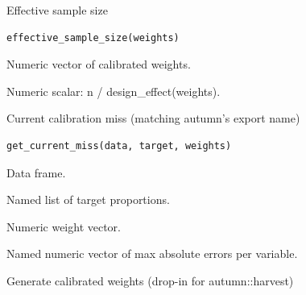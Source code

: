 \documentclass[a4paper]{book}
\begin{document}
%
\begin{Description}
Effective sample size
\end{Description}
%
\begin{Usage}
\begin{verbatim}
effective_sample_size(weights)
\end{verbatim}
\end{Usage}
%
\begin{Arguments}
\begin{ldescription}
\item[\code{weights}] Numeric vector of calibrated weights.
\end{ldescription}
\end{Arguments}
%
\begin{Value}
Numeric scalar: n / design\_effect(weights).
\end{Value}
%
\begin{Description}
Current calibration miss (matching autumn's export name)
\end{Description}
%
\begin{Usage}
\begin{verbatim}
get_current_miss(data, target, weights)
\end{verbatim}
\end{Usage}
%
\begin{Arguments}
\begin{ldescription}
\item[\code{data}] Data frame.

\item[\code{target}] Named list of target proportions.

\item[\code{weights}] Numeric weight vector.
\end{ldescription}
\end{Arguments}
%
\begin{Value}
Named numeric vector of max absolute errors per variable.
\end{Value}
%
\begin{Description}
Generate calibrated weights (drop-in for autumn::harvest)
\end{Description}
%
\end{document}
